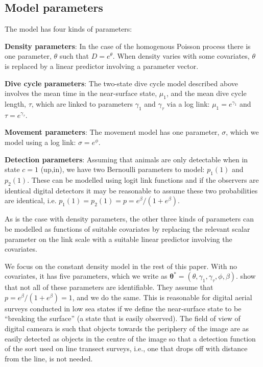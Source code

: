 \documentclass[useAMS, usenatbib, referee]{biom}\usepackage[]{graphicx}\usepackage[]{color}
\begin{document}
\subsection{Model parameters}

The model has four kinds of parameters:

\textbf{Density parameters}: In the case of the homogenous Poisson process there is one parameter, $\theta$ such that $D=e^{\theta}$. When density varies with some covariates, $\theta$ is replaced by a linear predictor involving a parameter vector.

\textbf{Dive cycle parameters}: The two-state dive cycle model described above involves the mean time in the near-surface state, $\mu_1$, and the mean dive cycle length, $\tau$, which are linked to parameters $\gamma_1$ and $\gamma_\tau$ via a log link: $\mu_1=e^{\gamma_1}$ and $\tau=e^{\gamma_\tau}$.

\textbf{Movement parameters}: The movement model has one parameter, $\sigma$, which we model using a log link: $\sigma=e^\phi$.

\textbf{Detection parameters}: Assuming that animals are only detectable when in state $c=1$ (up,in), we have two Bernoulli parameters to model: $p_1(1)$ and  $p_2(1)$. These can be modelled using logit link functions and if the observers are identical digital detectors it may be reasonable to assume these two probabilities are identical, i.e. $p_1(1)=p_2(1)=p=e^\beta/(1+e^\beta)$.

As is the case with density parameters, the other three kinds of parameters can be modelled as functions of suitable covariates by replacing the relevant scalar parameter on the link scale with a suitable linear predictor involving the covariates.

We focus on the constant density model in the rest of this paper. With no covariates, it has five parameters, which we write as $\bm{\theta}^*=(\theta,\gamma_1,\gamma_\tau, \phi, \beta)$. \cite{Stevenson+al:18} show that not all of these parameters are identifiable. They assume that $p=e^\beta/(1+e^\beta)=1$, and we do the same. This is reasonable for digital aerial surveys conducted in low sea states if we define the near-surface state to be ``breaking the surface'' (a state that is easily observed). The field of view of digital cameara is such that objects towards the periphery of the image are as easily detected as objects in the centre of the image so that a detection function of the sort used on line transect surveys, i.e., one that drops off with distance from the line, is not needed. 
\end{document}
